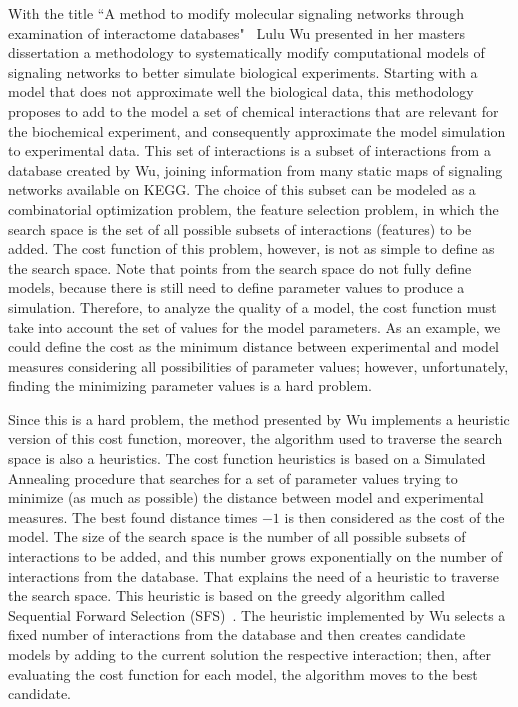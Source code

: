 With the title ``A method to modify molecular signaling networks through
examination of interactome databases"~\cite{Wu15} Lulu Wu presented in 
her masters dissertation a methodology to systematically modify 
computational models of signaling networks to better simulate biological 
experiments. Starting with a model that does not approximate well the 
biological data, this methodology proposes to add to the model
a set of chemical interactions that are relevant for the biochemical 
experiment, and consequently approximate the model simulation to 
experimental data. This set of interactions is a subset of interactions 
from a database created by Wu, joining information from many static 
maps of signaling networks available on KEGG. The choice of this subset 
can be modeled as a combinatorial optimization problem, the feature 
selection problem, in which the search space is the set of all possible 
subsets of interactions (features) to be added. The cost function of 
this problem, however, is not as simple to define as the search space. 
Note that points from the search space do not fully define models, 
because there is still need to define parameter values to produce a 
simulation. Therefore, to analyze the quality of a model, the cost 
function must take into account the set of values for the model 
parameters. As an example, we could define the cost as the minimum 
distance between experimental and model measures considering all 
possibilities of parameter values; however, unfortunately, finding the 
minimizing parameter values is a hard problem.

Since this is a hard problem, the method presented by Wu 
implements a heuristic version of this cost function, moreover, the 
algorithm used to traverse the search space is also a heuristics. The 
cost function heuristics is based on a Simulated Annealing procedure 
that searches for a set of parameter values trying to minimize (as much 
as possible) the distance between model and experimental measures. The 
best found distance times $-1$ is then considered as the cost of the 
model. The size of the search space is the number of all 
possible subsets of interactions to be added, and this number grows
exponentially on the number of interactions from the database. That
explains the need of a heuristic to traverse the search space. This
heuristic is based on the greedy algorithm called Sequential Forward
Selection (SFS)~\cite{Whitney1971}. The heuristic implemented by Wu
selects a fixed number of interactions from the database and then
creates candidate models by adding to the current solution the
respective interaction; then, after evaluating the cost function for
each model, the algorithm moves to the best candidate.

